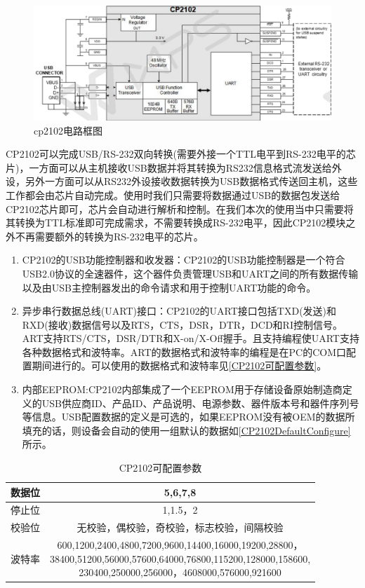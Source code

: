 \begin{figure}[!h]
\centering
\includegraphics[width=1.0\textwidth]{./graphics/cp2102-circuit-diagram.pdf}
\caption{cp2102电路框图}\label{fig:cp2102电路框图}
\end{figure}

	CP2102可以完成USB/RS-232双向转换(需要外接一个TTL电平到RS-232电平的芯片)，一方面可以从主机接收USB数据并将其转换为RS232信息格式流发送给外设，另外一方面可以从RS232外设接收数据转换为USB数据格式传送回主机，这些工作都会由芯片自动完成\cite{何源2006USB}。使用时我们只需要将数据通过USB的数据包发送给CP2102芯片即可，芯片会自动进行解析和控制。在我们本次的使用当中只需要将其转换为TTL标准即可完成需求，不需要转换成RS-232电平，因此CP2102模块之外不再需要额外的转换为RS-232电平的芯片。
		
\begin{enumerate}
\item CP2102的USB功能控制器和收发器：CP2102的USB功能控制器是一个符合USB2.0协议的全速器件，这个器件负责管理USB和UART之间的所有数据传输以及由USB主控制器发出的命令请求和用于控制UART功能的命令。
\item 异步串行数据总线(UART)接口：CP2102的UART接口包括TXD(发送)和RXD(接收)数据信号以及RTS，CTS，DSR，DTR，DCD和RI控制信号。ART支持RTS/CTS，DSR/DTR和X-on/X-Off握手。且支持编程使UART支持各种数据格式和波特率。ART的数据格式和波特率的编程是在PC的COM口配置期间进行的。可以使用的数据格式和波特率见\autoref{CP2102可配置参数}。
\item 内部EEPROM:CP2102内部集成了一个EEPROM用于存储设备原始制造商定义的USB供应商ID、产品ID、产品说明、电源参数、器件版本号和器件序列号等信息\cite{CP2102}。USB配置数据的定义是可选的，如果EEPROM没有被OEM的数据所填充的话，则设备会自动的使用一组默认的数据如\autoref{CP2102DefaultConfigure}所示。
\end{enumerate}

\begin{table}[!h]
\centering
\begin{tabular}{|c|c|}
\hline
{数据位} & {5,6,7,8} \\
\hline
{停止位} & {1,1.5，2} \\
\hline
{校验位} & {无校验，偶校验，奇校验，标志校验，间隔校验} \\
\hline
{波特率} & \tabincell{c}{600,1200,2400,4800,7200,9600,14400,16000,19200,28800，\\ 38400,51200,56000,57600,64000,76800,115200,128000,158600,\\ 230400,250000,256000，4608000,576000,921600}\\
\hline
\end{tabular} 
\caption{CP2102可配置参数}\label{CP2102可配置参数}
\end{table}

